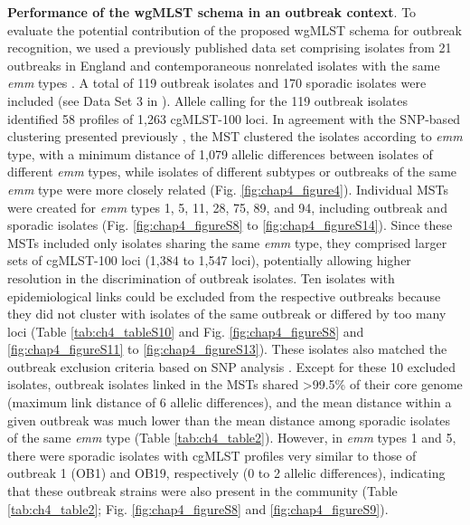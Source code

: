 \textbf{Performance of the wgMLST schema in an outbreak context}. To evaluate the potential contribution of the proposed \ac{wgMLST} schema for outbreak recognition, we used a previously published data set comprising isolates from 21 outbreaks in England and contemporaneous nonrelated isolates with the same \textit{emm} types \cite{coelho_genomic_2019}. A total of 119 outbreak isolates and 170 sporadic isolates were included (see Data Set 3 in \cite{friaes_supplemental_2023}). Allele calling for the 119 outbreak isolates identiﬁed 58 proﬁles of 1,263 cgMLST-100 loci. In agreement with the \ac{SNP}-based clustering presented previously \cite{coelho_genomic_2019}, the \ac{MST} clustered the isolates according to \textit{emm} type, with a minimum distance of 1,079 allelic differences between isolates of different \textit{emm} types, while isolates of different subtypes or outbreaks of the same \textit{emm} type were more closely related (Fig. \ref{fig:chap4_figure4}). Individual \ac{MST}s were created for \textit{emm} types 1, 5, 11, 28, 75, 89, and 94, including outbreak and sporadic isolates (Fig. \ref{fig:chap4_figureS8} to \ref{fig:chap4_figureS14}). Since these \ac{MST}s included only isolates sharing the same \textit{emm} type, they comprised larger sets of cgMLST-100 loci (1,384 to 1,547 loci), potentially allowing higher resolution in the discrimination of outbreak isolates. Ten isolates with epidemiological links could be excluded from the respective outbreaks because they did not cluster with isolates of the same outbreak or differed by too many loci (Table \ref{tab:ch4_tableS10} and Fig. \ref{fig:chap4_figureS8} and \ref{fig:chap4_figureS11} to \ref{fig:chap4_figureS13}). These isolates also matched the outbreak exclusion criteria based on \ac{SNP} analysis \cite{coelho_genomic_2019}. Except for these 10 excluded isolates, outbreak isolates linked in the \ac{MST}s shared >99.5\% of their core genome (maximum link distance of 6 allelic differences), and the mean distance within a given outbreak was much lower than the mean distance among sporadic isolates of the same \textit{emm} type (Table \ref{tab:ch4_table2}). However, in \textit{emm} types 1 and 5, there were sporadic isolates with \ac{cgMLST} proﬁles very similar to those of outbreak 1 (OB1) and OB19, respectively (0 to 2 allelic differences), indicating that these outbreak strains were also present in the community (Table \ref{tab:ch4_table2}; Fig. \ref{fig:chap4_figureS8} and \ref{fig:chap4_figureS9}).

